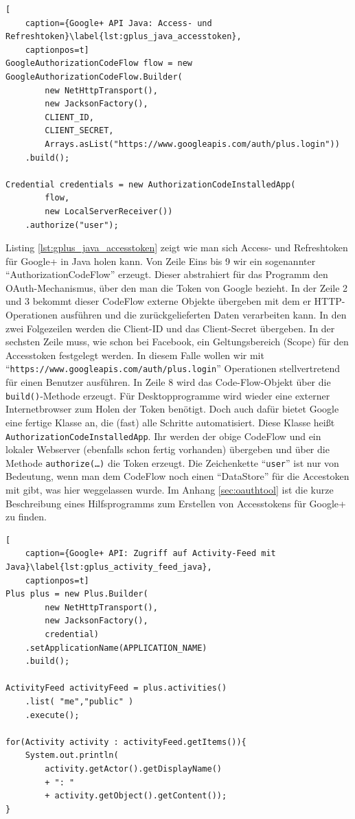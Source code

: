\begin{lstlisting}[
    caption={Google+ API Java: Access- und Refreshtoken}\label{lst:gplus_java_accesstoken},
    captionpos=t]
GoogleAuthorizationCodeFlow flow = new GoogleAuthorizationCodeFlow.Builder(
        new NetHttpTransport(),
        new JacksonFactory(),
        CLIENT_ID,
        CLIENT_SECRET,
        Arrays.asList("https://www.googleapis.com/auth/plus.login"))
    .build();

Credential credentials = new AuthorizationCodeInstalledApp(
        flow,
        new LocalServerReceiver())
    .authorize("user");
\end{lstlisting}

Listing \ref{lst:gplus_java_accesstoken} zeigt wie man sich Access- und Refreshtoken für Google+ in Java holen kann. Von Zeile Eins bis 9 wir ein sogenannter \enquote{AuthorizationCodeFlow} erzeugt. Dieser abstrahiert für das Programm den OAuth-Mechanismus, über den man die Token von Google bezieht. In der Zeile 2 und 3 bekommt dieser CodeFlow externe Objekte übergeben mit dem er HTTP-Operationen ausführen und die zurückgelieferten Daten verarbeiten kann. In den zwei Folgezeilen werden die Client-ID und das Client-Secret übergeben. In der sechsten Zeile muss, wie schon bei Facebook, ein Geltungsbereich (Scope) für den Accesstoken festgelegt werden. In diesem Falle wollen wir mit \enquote{\texttt{https://www.googleapis.com/auth/plus.login}} Operationen stellvertretend für einen Benutzer ausführen. In Zeile 8 wird das Code-Flow-Objekt über die \texttt{build()}-Methode erzeugt. Für Desktopprogramme wird wieder eine externer Internetbrowser zum Holen der Token benötigt. Doch auch dafür bietet Google eine fertige Klasse an, die (fast) alle Schritte automatisiert. Diese Klasse heißt \texttt{AuthorizationCodeInstalledApp}. Ihr werden der obige CodeFlow und ein lokaler Webserver (ebenfalls schon fertig vorhanden) übergeben und über die Methode \texttt{authorize(\dots)} die Token erzeugt. Die Zeichenkette \enquote{\texttt{user}} ist nur von Bedeutung, wenn man dem CodeFlow noch einen \enquote{DataStore} für die Accestoken mit gibt, was hier weggelassen wurde. Im Anhang \ref{sec:oauthtool} ist die kurze Beschreibung eines Hilfsprogramms zum Erstellen von Accesstokens für Google+ zu finden.

\begin{lstlisting}[
    caption={Google+ API: Zugriff auf Activity-Feed mit Java}\label{lst:gplus_activity_feed_java},
    captionpos=t]
Plus plus = new Plus.Builder(
        new NetHttpTransport(), 
        new JacksonFactory(),
        credential)
    .setApplicationName(APPLICATION_NAME)
    .build();

ActivityFeed activityFeed = plus.activities()
    .list( "me","public" )
    .execute();

for(Activity activity : activityFeed.getItems()){
    System.out.println(
        activity.getActor().getDisplayName() 
        + ": " 
        + activity.getObject().getContent());
}
\end{lstlisting}

